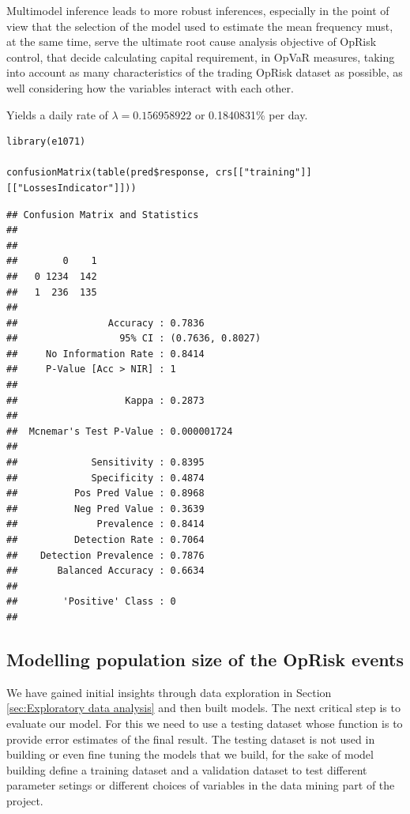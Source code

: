 \documentclass{DissertateUSU}
\begin{document}
Multimodel inference leads to more robust inferences, especially in the
point of view that the selection of the model used to estimate the mean
frequency must, at the same time, serve the ultimate root cause analysis
objective of OpRisk control, that decide calculating capital
requirement, in OpVaR measures, taking into account as many
characteristics of the trading OpRisk dataset as possible, as well
considering how the variables interact with each other.

Yields a daily rate of \(\lambda = 0.156958922\) or 0.1840831\% per
day.\medskip

\begin{verbatim}
library(e1071)

confusionMatrix(table(pred$response, crs[["training"]][["LossesIndicator"]]))
\end{verbatim}

\begin{verbatim}
## Confusion Matrix and Statistics
## 
##    
##        0    1
##   0 1234  142
##   1  236  135
##                                           
##                Accuracy : 0.7836          
##                  95% CI : (0.7636, 0.8027)
##     No Information Rate : 0.8414          
##     P-Value [Acc > NIR] : 1               
##                                           
##                   Kappa : 0.2873          
##                                           
##  Mcnemar's Test P-Value : 0.000001724     
##                                           
##             Sensitivity : 0.8395          
##             Specificity : 0.4874          
##          Pos Pred Value : 0.8968          
##          Neg Pred Value : 0.3639          
##              Prevalence : 0.8414          
##          Detection Rate : 0.7064          
##    Detection Prevalence : 0.7876          
##       Balanced Accuracy : 0.6634          
##                                           
##        'Positive' Class : 0               
## 
\end{verbatim}

\subsection{Modelling population size of the OpRisk events}

We have gained initial insights through data exploration in Section
\ref{sec:Exploratory data analysis} and then built models. The next
critical step is to evaluate our model. For this we need to use a
testing dataset whose function is to provide error estimates of the
final result. The testing dataset is not used in building or even fine
tuning the models that we build, for the sake of model building define a
training dataset and a validation dataset to test different parameter
setings or different choices of variables in the data mining part of the
project.\medskip
\end{document}

